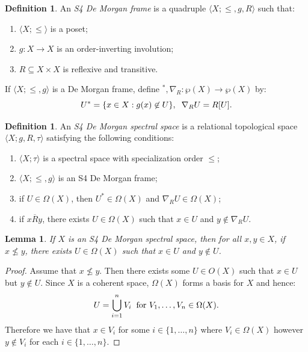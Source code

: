 \documentclass{amsart}
\theoremstyle{plain}
\newtheorem{lemma}[theorem]{Lemma}
\theoremstyle{definition}
\newtheorem{definition}[theorem]{Definition}
\begin{document}
 
\begin{definition}\label{de morgan frame}
    An \emph{S4 De Morgan frame} is a quadruple $\langle X;\leq,g,R\rangle$ such that:
    \begin{enumerate}
        \item $\langle X;\leq\rangle$ is a poset; 
        \item $g\colon X\to X$ is an order-inverting involution; 
        \item $R\subseteq X\times X$ is reflexive and transitive.
    \end{enumerate}
\end{definition}
\noindent If $\langle X;\leq,g\rangle$ is a De Morgan frame, define $^*,\nabla_R\colon\wp(X)\to\wp(X)$ by:  
\[U^*=\{x\in X:g(x)\not\in U\}, \hspace{.2cm}\nabla_RU=R[U].\]

\begin{definition}\label{modal de morgan spectral space}
    An \emph{S4 De Morgan spectral space} is a relational topological space $\langle X;g,R,\tau\rangle$ satisfying the following conditions: 
    \begin{enumerate}
        \item $\langle X;\tau\rangle$ is a spectral space with specialization order $\leqslant$;   
        \item $\langle X;\leqslant,g\rangle$ is an S4 De Morgan frame;   
         \item if $U\in \Omega(X)$, then $U^*\in\Omega(X)$ and $\nabla_RU\in \Omega(X)$; 
         \item if $x\overline{R}y$, there exists $U\in\Omega(X)$ such that $x\in U$ and $y\not\in\nabla_RU$.    
    \end{enumerate}
\end{definition}
\begin{lemma}\label{separation property}
    If $X$ is an S4 De Morgan spectral space, then for all $x,y\in X$, if $x\not\leqslant y$, there exists $U\in\Omega(X)$ such that $x\in U$ and $y\not\in U$. 
\end{lemma}
\begin{proof}
    Assume that $x\not\leqslant y$. Then there exists some $U\in O(X)$ such that $x\in U$ but $y\not\in U$. Since $X$ is a coherent space, $\Omega(X)$ forms a basis for $X$ and hence: 
    \[U=\bigcup^n_{i=1}V_i\hspace{.2cm}\text{for $V_1,\dots, V_n\in\Omega(X)$}.\] Therefore we have that $x\in V_i$ for some $i\in\{1,\dots, n\}$ where $V_i\in\Omega(X)$ however $y\not\in V_i$ for each $i\in\{1,\dots,n\}$.  
\end{proof}
\end{document}
